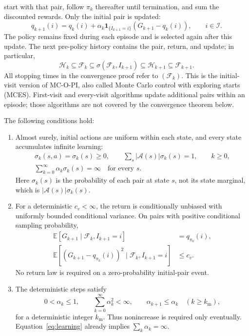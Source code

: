 start with that pair, follow $\pi_k$ thereafter until termination, and sum the discounted rewards.
Only the initial pair is updated:
\begin{equation}\label{eq:update}
q_{k+1}(i)=q_k(i)+\alpha_k\mathbf1_{\{I_{k+1}=i\}}(G_{k+1}-q_k(i)),\qquad i\in\mathcal I.
\end{equation}
The policy remains fixed during each episode and is selected again after this update. The
next pre-policy history contains the pair, return, and update; in particular,
\[
\mathcal H_k\subseteq\mathcal F_k\subseteq\sigma(\mathcal F_k,I_{k+1})\subseteq\mathcal H_{k+1}\subseteq\mathcal F_{k+1}.
\]
All stopping times in the convergence proof refer to $(\mathcal F_k)$. This is the initial-visit version
of MC-O-PI, also called Monte Carlo control with exploring starts (MCES). First-visit and
every-visit algorithms update additional pairs within an episode; those algorithms are not
covered by the convergence theorem below.

\begin{assumption}\label{asp:main}
The following conditions hold:
\begin{enumerate}[label=(\arabic*)]
\item Almost surely, initial actions are uniform within each state, and every state accumulates
infinite learning:
\begin{equation}\label{eq:learning}
\begin{gathered}
\sigma_k(s,a)=\sigma_k(s)\ge0,\qquad
\sum_s|\mathcal A(s)|\sigma_k(s)=1,\qquad k\ge0,\\
\sum_{k=0}^{\infty}\alpha_k\sigma_k(s)=\infty\quad\text{for every }s.
\end{gathered}
\end{equation}
Here $\sigma_k(s)$ is the probability of each pair at state $s$, not its state marginal, which is
$|\mathcal A(s)|\sigma_k(s)$.
\item For a deterministic $c_v<\infty$, the return is conditionally unbiased with uniformly bounded
conditional variance. On pairs with positive conditional sampling probability,
\begin{equation}\label{eq:moments}
\begin{aligned}
\mathbb E[G_{k+1}\mid\mathcal F_k,I_{k+1}=i]&=q_{\pi_k}(i),\\
\mathbb E[(G_{k+1}-q_{\pi_k}(i))^2\mid\mathcal F_k,I_{k+1}=i]&\le c_v.
\end{aligned}
\end{equation}
No return law is required on a zero-probability initial-pair event.
\item The deterministic steps satisfy
\begin{equation}\label{eq:steps}
0<\alpha_k\le1,\qquad\sum_{k=0}^{\infty}\alpha_k^2<\infty,\qquad
\alpha_{k+1}\le\alpha_k\quad(k\ge k_{\mathrm m}),
\end{equation}
for a deterministic integer $k_{\mathrm m}$. Thus nonincrease is required only eventually. Equation~\eqref{eq:learning} already implies $\sum_k\alpha_k=\infty$.
\end{enumerate}
\end{assumption}


